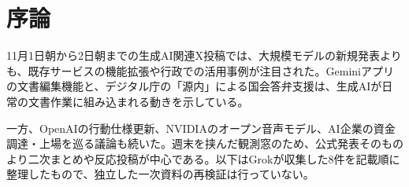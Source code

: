 \section*{序論}
11月1日朝から2日朝までの生成AI関連X投稿では、大規模モデルの新規発表よりも、既存サービスの機能拡張や行政での活用事例が注目された。Geminiアプリの文書編集機能と、デジタル庁の「源内」による国会答弁支援は、生成AIが日常の文書作業に組み込まれる動きを示している。

一方、OpenAIの行動仕様更新、NVIDIAのオープン音声モデル、AI企業の資金調達・上場を巡る議論も続いた。週末を挟んだ観測窓のため、公式発表そのものより二次まとめや反応投稿が中心である。以下はGrokが収集した8件を記載順に整理したもので、独立した一次資料の再検証は行っていない。
